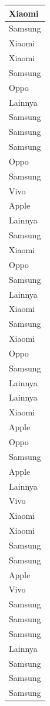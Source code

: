 \documentclass[
  letterpaper,
  DIV=11,
  numbers=noendperiod]{scrartcl}
\begin{document}
\begin{table}
\begin{tabular}[t]{l}
\hline
Xiaomi\\
\hline
Samsung\\
\hline
Xiaomi\\
\hline
Xiaomi\\
\hline
Samsung\\
\hline
Oppo\\
\hline
Lainnya\\
\hline
Samsung\\
\hline
Samsung\\
\hline
Samsung\\
\hline
Oppo\\
\hline
Samsung\\
\hline
Vivo\\
\hline
Apple\\
\hline
Lainnya\\
\hline
Samsung\\
\hline
Xiaomi\\
\hline
Oppo\\
\hline
Samsung\\
\hline
Lainnya\\
\hline
Xiaomi\\
\hline
Samsung\\
\hline
Xiaomi\\
\hline
Oppo\\
\hline
Samsung\\
\hline
Lainnya\\
\hline
Lainnya\\
\hline
Xiaomi\\
\hline
Apple\\
\hline
Oppo\\
\hline
Samsung\\
\hline
Apple\\
\hline
Lainnya\\
\hline
Vivo\\
\hline
Xiaomi\\
\hline
Xiaomi\\
\hline
Samsung\\
\hline
Samsung\\
\hline
Apple\\
\hline
Vivo\\
\hline
Samsung\\
\hline
Samsung\\
\hline
Samsung\\
\hline
Lainnya\\
\hline
Samsung\\
\hline
Samsung\\
\hline
Samsung\\

\end{tabular}
\end{table}
\end{document}
